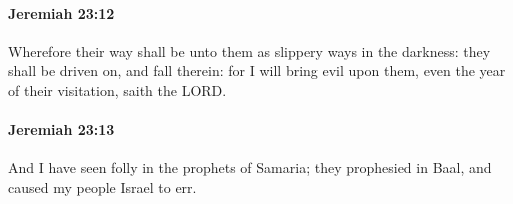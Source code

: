 		\paragraph{Jeremiah 23:12} %
			\label{JEREMIAH-23-12}

			Wherefore their way shall be unto them as slippery ways in the darkness: they shall be driven on, and fall therein: for I will bring evil upon them, even the year of their visitation, saith the LORD.


		\paragraph{Jeremiah 23:13} %
			\label{JEREMIAH-23-13}

			And I have seen folly in the prophets of Samaria; they prophesied in Baal, and caused my people Israel to err.


